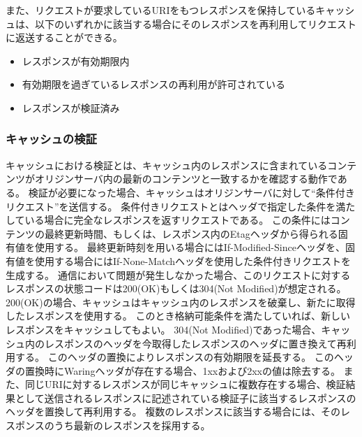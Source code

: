 \documentclass{css}
\begin{document}
また、リクエストが要求しているURIをもつレスポンスを保持しているキャッシュは、以下のいずれかに該当する場合にそのレスポンスを再利用してリクエストに返送することができる。

\begin{itemize}
\item レスポンスが有効期限内
\item 有効期限を過ぎているレスポンスの再利用が許可されている
\item レスポンスが検証済み
\end{itemize}

\subsubsection{キャッシュの検証}
キャッシュにおける検証とは、キャッシュ内のレスポンスに含まれているコンテンツがオリジンサーバ内の最新のコンテンツと一致するかを確認する動作である。
検証が必要になった場合、キャッシュはオリジンサーバに対して``条件付きリクエスト''を送信する。
条件付きリクエストとはヘッダで指定した条件を満たしている場合に完全なレスポンスを返すリクエストである。
この条件にはコンテンツの最終更新時間、もしくは、レスポンス内のEtagヘッダから得られる固有値を使用する。
最終更新時刻を用いる場合にはIf-Modified-Sinceヘッダを、固有値を使用する場合にはIf-None-Matchヘッダを使用した条件付きリクエストを生成する。
通信において問題が発生しなかった場合、このリクエストに対するレスポンスの状態コードは200(OK)もしくは304(Not Modified)が想定される。
200(OK)の場合、キャッシュはキャッシュ内のレスポンスを破棄し、新たに取得したレスポンスを使用する。
このとき格納可能条件を満たしていれば、新しいレスポンスをキャッシュしてもよい。
304(Not Modified)であった場合、キャッシュ内のレスポンスのヘッダを今取得したレスポンスのヘッダに置き換えて再利用する。
このヘッダの置換によりレスポンスの有効期限を延長する。
このヘッダの置換時にWaringヘッダが存在する場合、1xxおよび2xxの値は除去する。
また、同じURIに対するレスポンスが同じキャッシュに複数存在する場合、検証結果として送信されるレスポンスに記述されている検証子に該当するレスポンスのヘッダを置換して再利用する。
複数のレスポンスに該当する場合には、そのレスポンスのうち最新のレスポンスを採用する。
\end{document}
